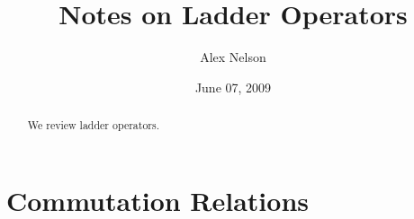 \documentclass[draft]{amsart}
\title{Notes on Ladder Operators}
\date{June 07, 2009}
\author{Alex Nelson}
\numberwithin{equation}{section}
\theoremstyle{definition}
\begin{document}
\begin{abstract}
We review ladder operators.
\end{abstract}
\maketitle
\section{Commutation Relations}


\nocite{*}


\end{document}
